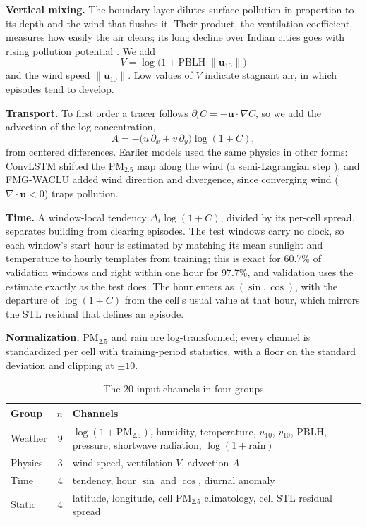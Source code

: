 \documentclass[journal]{IEEEtran}
\newcommand{\PM}{PM$_{2.5}$}
\begin{document}
\textbf{Vertical mixing.} The boundary layer dilutes surface pollution in proportion to its depth and the wind that flushes it. Their product, the ventilation coefficient, measures how easily the air clears; its long decline over Indian cities goes with rising pollution potential \cite{iyer2013}. We add
\begin{equation}
V = \log\bigl(1+\mathrm{PBLH}\cdot\|\mathbf{u}_{10}\|\bigr)
\end{equation}
and the wind speed $\|\mathbf{u}_{10}\|$. Low values of $V$ indicate stagnant air, in which episodes tend to develop.

\textbf{Transport.} To first order a tracer follows $\partial_t C = -\mathbf{u}\cdot\nabla C$, so we add the advection of the log concentration,
\begin{equation}
A = -\bigl(u\,\partial_x + v\,\partial_y\bigr)\log(1+C),
\end{equation}
from centered differences. Earlier models used the same physics in other forms: ConvLSTM shifted the \PM{} map along the wind (a semi-Lagrangian step \cite{staniforth1991}), and FMG-WACLU added wind direction and divergence, since converging wind ($\nabla\cdot\mathbf{u}<0$) traps pollution.

\textbf{Time.} A window-local tendency $\Delta_t\log(1+C)$, divided by its per-cell spread, separates building from clearing episodes. The test windows carry no clock, so each window's start hour is estimated by matching its mean sunlight and temperature to hourly templates from training; this is exact for 60.7\% of validation windows and right within one hour for 97.7\%, and validation uses the estimate exactly as the test does. The hour enters as $(\sin,\cos)$, with the departure of $\log(1+C)$ from the cell's usual value at that hour, which mirrors the STL residual that defines an episode.

\textbf{Normalization.} \PM{} and rain are log-transformed; every channel is standardized per cell with training-period statistics, with a floor on the standard deviation and clipping at $\pm10$.

\begin{table}[!htb]
\centering
\caption{The 20 input channels in four groups}
\label{tab:features}
\begin{tabular}{@{}lrp{}@{}}
\toprule
Group & $n$ & Channels \\
\midrule
Weather & 9 & $\log(1+\text{\PM})$, humidity, temperature, $u_{10}$, $v_{10}$, PBLH, pressure, shortwave radiation, $\log(1+\text{rain})$ \\
Physics & 3 & wind speed, ventilation $V$, advection $A$ \\
Time & 4 & tendency, hour $\sin$ and $\cos$, diurnal anomaly \\
Static & 4 & latitude, longitude, cell \PM{} climatology, cell STL residual spread \\
\bottomrule
\end{tabular}
\end{table}
\end{document}
